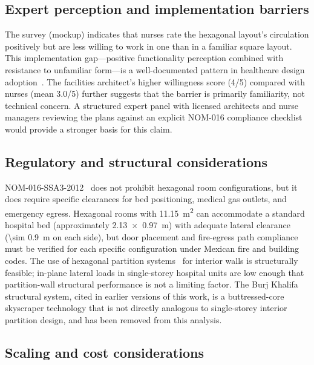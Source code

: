 \documentclass[12pt,a4paper]{article}
\begin{document}
\subsection{Expert perception and implementation barriers}

The survey (mockup) indicates that nurses rate the hexagonal layout's circulation
positively but are less willing to work in one than in a familiar square layout.
This implementation gap---positive functionality perception combined with
resistance to unfamiliar form---is a well-documented pattern in healthcare
design adoption~\cite{totaforti2018biophilic,zhong2022biophilic}.
The facilities architect's higher willingness score (4/5) compared with nurses
(mean 3.0/5) further suggests that the barrier is primarily familiarity, not
technical concern.
A structured expert panel with licensed architects and nurse managers reviewing
the plans against an explicit NOM-016 compliance checklist would provide a
stronger basis for this claim.

\subsection{Regulatory and structural considerations}

NOM-016-SSA3-2012~\cite{nom016ssa2012} does not prohibit hexagonal room
configurations, but it does require specific clearances for bed positioning,
medical gas outlets, and emergency egress.
Hexagonal rooms with \SI{11.15}{\metre\squared} can accommodate a standard
hospital bed (approximately \SI{2.13 x 0.97}{\metre}) with adequate lateral
clearance (\SI{\sim 0.9}{\metre} on each side), but door placement and
fire-egress path compliance must be verified for each specific configuration
under Mexican fire and building codes.
The use of hexagonal partition systems~\cite{hexpartition2010} for interior walls
is structurally feasible; in-plane lateral loads in single-storey hospital units
are low enough that partition-wall structural performance is not a limiting factor.
The Burj Khalifa structural system, cited in earlier versions of this work, is a
buttressed-core skyscraper technology that is not directly analogous to
single-storey interior partition design, and has been removed from this analysis.

\subsection{Scaling and cost considerations}
\end{document}
